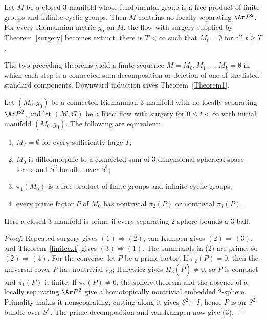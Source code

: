 \begin{theorem}
\label{thm:ricci-flow-surgery-finite-extinction}
\label{finiteext}
Let $M$ be a closed $3$-manifold whose fundamental group is a free product of
finite groups and infinite cyclic groups. Then $M$ contains no locally
separating $\Ar P^2$. For every Riemannian metric $g_0$ on $M$, the flow with
surgery supplied by Theorem~\ref{surgery} becomes extinct: there is $T<\infty$
such that $M_t=\emptyset$ for all $t\geq T$.
\end{theorem}

The two preceding theorems yield a finite sequence
$M=M_0,M_1,\ldots,M_k=\emptyset$ in which each step is a connected-sum
decomposition or deletion of one of the listed standard components. Downward
induction gives Theorem~\ref{Theorem1}.

\begin{corollary}
\label{cor:extinction-equivalence}
\label{corequiv}
Let $(M_0,g_0)$ be a connected Riemannian $3$-manifold with no locally
separating $\Ar P^2$, and let $({\mathcal M},G)$ be a Ricci flow with surgery
for $0\leq t<\infty$ with initial manifold $(M_0,g_0)$. The following are
equivalent:
\begin{enumerate}
\item[(1)] $M_T=\emptyset$ for every sufficiently large $T$;
\item[(2)] $M_0$ is diffeomorphic to a connected sum of $3$-dimensional
spherical space-forms and $S^2$-bundles over $S^1$;
\item[(3)] $\pi_1(M_0)$ is a free product of finite groups and infinite cyclic
groups;
\item[(4)] every prime factor $P$ of $M_0$ has nontrivial $\pi_2(P)$ or
nontrivial $\pi_3(P)$.
\end{enumerate}
Here a closed $3$-manifold is prime if every separating $2$-sphere bounds a
$3$-ball.
\end{corollary}

\begin{proof}
\sketch
{}
Repeated surgery gives $(1)\Rightarrow(2)$, van Kampen gives
$(2)\Rightarrow(3)$, and Theorem~\ref{finiteext} gives
$(3)\Rightarrow(1)$. The summands in (2) are prime, so
$(2)\Rightarrow(4)$. For the converse, let $P$ be a prime factor. If
$\pi_2(P)=0$, then the universal cover $\widetilde P$ has nontrivial
$\pi_3$; Hurewicz gives $H_3(\widetilde P)\neq0$, so $\widetilde P$ is compact
and $\pi_1(P)$ is finite. If $\pi_2(P)\neq0$, the sphere theorem and the
absence of a locally separating $\Ar P^2$ give a homotopically nontrivial
embedded $2$-sphere. Primality makes it nonseparating; cutting along it gives
$S^2\times I$, hence $P$ is an $S^2$-bundle over $S^1$. The prime
decomposition and van Kampen now give (3).
\end{proof}

